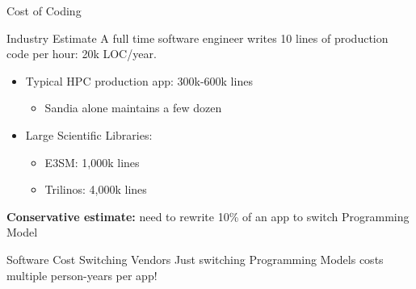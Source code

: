 \begin{frame}[fragile]{Cost of Coding}

\begin{block}{Industry Estimate}
A full time software engineer writes 10 lines of production code per hour: 20k LOC/year.
\end{block}

	\begin{itemize}
		\item Typical HPC production app: 300k-600k lines
			\begin{itemize}
				\item Sandia alone maintains a few dozen
			\end{itemize}
		\item Large Scientific Libraries:
			\begin{itemize}
				\item E3SM: 1,000k lines
				\item Trilinos: 4,000k lines
			\end{itemize}
	\end{itemize}

	\textbf{Conservative estimate:} need to rewrite 10\% of an app to switch Programming Model

	\pause

\begin{block}{Software Cost Switching Vendors}
Just switching Programming Models costs multiple person-years per app!
\end{block}

\end{frame}

